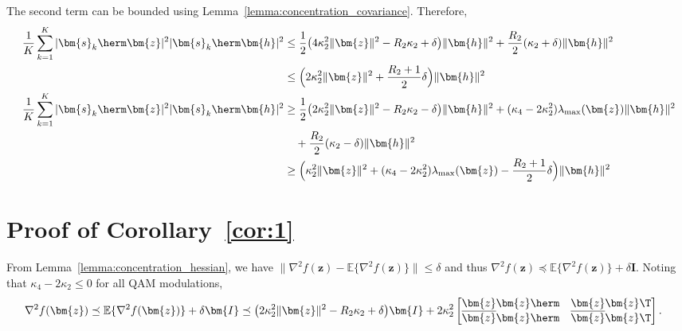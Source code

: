The second term can be bounded using Lemma~\ref{lemma:concentration_covariance}. Therefore,
\begin{align}
\frac{1}{K}\sum_{k=1}^K|\bm{s}_k\herm\bm{z}|^2|\bm{s}_k\herm\bm{h}|^2&\leq \frac{1}{2}\big(4\kappa_2^2\|\bm{z}\|^2 -R_2\kappa_2+ \delta\big)\|\bm{h}\|^2+\frac{R_2}{2}(\kappa_2+\delta)\|\bm{h}\|^2\nonumber\\
&\leq \Big(2\kappa_2^2\|\bm{z}\|^2+\frac{R_2+1}{2}\delta\Big)\|\bm{h}\|^2\\
\frac{1}{K}\sum_{k=1}^K|\bm{s}_k\herm\bm{z}|^2|\bm{s}_k\herm\bm{h}|^2&\geq \frac{1}{2}\big(2\kappa_2^2\|\bm{z}\|^2-R_2\kappa_2-\delta\big)\|\bm{h}\|^2+ (\kappa_4-2\kappa_2^2)\lambda_{\mathrm{max}}(\bm{z})\|\bm{h}\|^2	\nonumber\\
&\quad+\frac{R_2}{2} (\kappa_2-\delta)\|\bm{h}\|^2\nonumber\\
&\geq \Big(\kappa_2^2\|\bm{z}\|^2+ (\kappa_4-2\kappa_2^2)\lambda_{\mathrm{max}}(\bm{z})-\frac{R_2+1}{2}\delta\Big)\|\bm{h}\|^2
\end{align}


\section{Proof of Corollary~\ref{cor:1}}\label{appdx:corolary1}
From Lemma~\ref{lemma:concentration_hessian}, we have $\|\nabla^2 f(\bm{z}) - \mathbb{E}\{\nabla^2 f(\bm{z})\}\| \leq \delta $ and thus
$\nabla^2 f(\bm{z}) \preceq \mathbb{E}\{\nabla^2 f(\bm{z})\}+ \delta\bm{I}$. Noting that $\kappa_4-2\kappa_2\leq0$ for all QAM modulations, 
\begin{align}
\nabla^2 f(\bm{z}) &\preceq \mathbb{E}\{\nabla^2 f(\bm{z})\}+ \delta\bm{I} \preceq \big(2\kappa_2^2\|\bm{z}\|^2-R_2\kappa_2+\delta\big)\bm{I} + 2\kappa_2^2\begin{bmatrix}
\bm{z}\bm{z}\herm&\bm{z}\bm{z}\T\\
\overline{\bm{z}}\bm{z}\herm&\overline{\bm{z}}\bm{z}\T \label{eqn:upperBound_hessian}
\end{bmatrix}.
\end{align}

